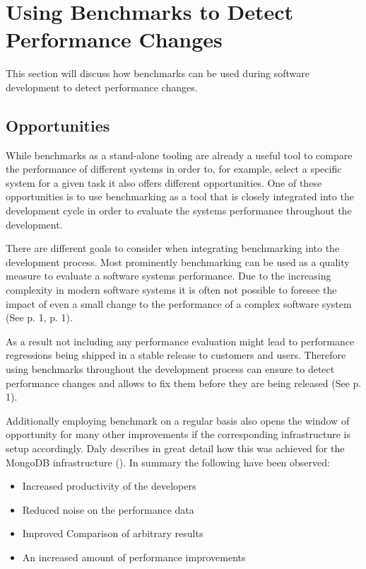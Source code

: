 \documentclass[	runningheads,
				a4paper]{llncs}
\begin{document}
\section{Using Benchmarks to Detect Performance Changes}
\label{sec:bench_perf_changes}
	This section will discuss how benchmarks can be used during software development to detect performance changes.
	
	\subsection{Opportunities}
	\label{ssec:bench_perf_oppo}
	While benchmarks as a stand-alone tooling are already a useful tool to compare the performance of different systems in order to, for example, select a specific system for a given task it also offers different opportunities. One of these opportunities is to use benchmarking as a tool that is closely integrated into the development cycle in order to evaluate the systems performance throughout the development.

	There are different goals to consider when integrating benchmarking into the development process. Most prominently benchmarking can be used as a quality measure to evaluate a software systems performance. Due to the increasing complexity in modern software systems it is often not possible to foresee the impact of even a small change to the performance of a complex software system (See \cite{grambow2019} p. 1, \cite{daly2021} p. 1). 
	
	As a result not including any performance evaluation might lead to performance regressions being shipped in a stable release to customers and users. Therefore using benchmarks throughout the development process can ensure to detect performance changes and allows to fix them before they are being released (See \cite{daly2021} p. 1). 

	Additionally employing benchmark on a regular basis also opens the window of opportunity for many other improvements if the corresponding infrastructure is setup accordingly. Daly describes in great detail how this was achieved for the MongoDB infrastructure (\cite{daly2021}). In summary the following have been observed:
	\begin{itemize}
		\item Increased productivity of the developers
		\item Reduced noise on the performance data
		\item Improved Comparison of arbitrary results
		\item An increased amount of performance improvements
	\end{itemize}
\end{document}
